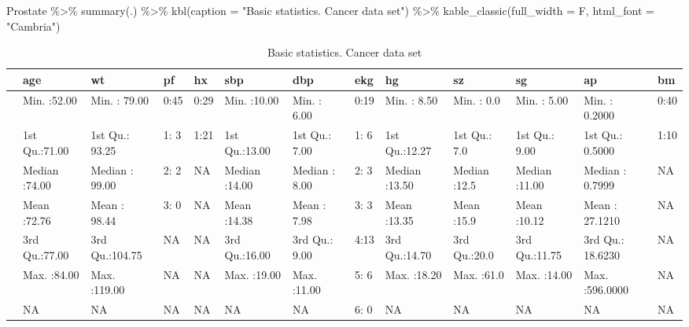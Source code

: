 \documentclass[
]{article}
\newenvironment{Shaded}{\begin{snugshade}}{\end{snugshade}}
\newcommand{\AttributeTok}[1]{\textcolor[rgb]{0.77,0.63,0.00}{#1}}
\newcommand{\FunctionTok}[1]{\textcolor[rgb]{0.00,0.00,0.00}{#1}}
\newcommand{\NormalTok}[1]{#1}
\newcommand{\SpecialCharTok}[1]{\textcolor[rgb]{0.00,0.00,0.00}{#1}}
\newcommand{\StringTok}[1]{\textcolor[rgb]{0.31,0.60,0.02}{#1}}
\begin{document}
\begin{Shaded}
\begin{Highlighting}[]
\NormalTok{Prostate }\SpecialCharTok{\%\textgreater{}\%} 
  \FunctionTok{summary}\NormalTok{(.) }\SpecialCharTok{\%\textgreater{}\%} 
  \FunctionTok{kbl}\NormalTok{(}\AttributeTok{caption =} \StringTok{"Basic statistics. Cancer data set"}\NormalTok{) }\SpecialCharTok{\%\textgreater{}\%}
  \FunctionTok{kable\_classic}\NormalTok{(}\AttributeTok{full\_width =}\NormalTok{ F, }\AttributeTok{html\_font =} \StringTok{"Cambria"}\NormalTok{)}
\end{Highlighting}
\end{Shaded}

\begin{table}

\caption{\label{tab:unnamed-chunk-7}Basic statistics. Cancer data set}
\centering
\begin{tabular}[t]{l|l|l|l|l|l|l|l|l|l|l|l|l}
\hline
  &      age &       wt & pf & hx &      sbp &      dbp & ekg &       hg &       sz &       sg &       ap & bm\\
\hline
 & Min.   :52.00 & Min.   : 79.00 & 0:45 & 0:29 & Min.   :10.00 & Min.   : 6.00 & 0:19 & Min.   : 8.50 & Min.   : 0.0 & Min.   : 5.00 & Min.   :  0.2000 & 0:40\\
\hline
 & 1st Qu.:71.00 & 1st Qu.: 93.25 & 1: 3 & 1:21 & 1st Qu.:13.00 & 1st Qu.: 7.00 & 1: 6 & 1st Qu.:12.27 & 1st Qu.: 7.0 & 1st Qu.: 9.00 & 1st Qu.:  0.5000 & 1:10\\
\hline
 & Median :74.00 & Median : 99.00 & 2: 2 & NA & Median :14.00 & Median : 8.00 & 2: 3 & Median :13.50 & Median :12.5 & Median :11.00 & Median :  0.7999 & NA\\
\hline
 & Mean   :72.76 & Mean   : 98.44 & 3: 0 & NA & Mean   :14.38 & Mean   : 7.98 & 3: 3 & Mean   :13.35 & Mean   :15.9 & Mean   :10.12 & Mean   : 27.1210 & NA\\
\hline
 & 3rd Qu.:77.00 & 3rd Qu.:104.75 & NA & NA & 3rd Qu.:16.00 & 3rd Qu.: 9.00 & 4:13 & 3rd Qu.:14.70 & 3rd Qu.:20.0 & 3rd Qu.:11.75 & 3rd Qu.: 18.6230 & NA\\
\hline
 & Max.   :84.00 & Max.   :119.00 & NA & NA & Max.   :19.00 & Max.   :11.00 & 5: 6 & Max.   :18.20 & Max.   :61.0 & Max.   :14.00 & Max.   :596.0000 & NA\\
\hline
 & NA & NA & NA & NA & NA & NA & 6: 0 & NA & NA & NA & NA & NA\\
\hline
\end{tabular}
\end{table}
\end{document}
